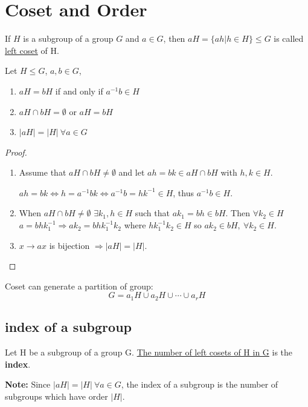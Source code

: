 \documentclass[11pt]{elegantbook}
\begin{document}
\section{Coset and Order}
\begin{definition}
If $H$ is a subgroup of a group $G$ and $a\in G$, then $aH=\{ah|h\in H\}\leq G$ is called \underline{left coset} of H.
\end{definition}
\begin{theorem}
Let $H\leq G$, $a,b\in G$,
\begin{enumerate}
    \item $aH=bH$ if and only if $a^{-1}b\in H$
    \item $aH\cap bH=\emptyset$ or $aH=bH$
    \item $|aH|=|H|\ \forall a\in G$
\end{enumerate}
\end{theorem}
\begin{proof}
    \quad

    \begin{enumerate}
        \item Assume that $aH\cap bH\neq \emptyset$ and let $ah=bk\in aH\cap bH$ with $h,k\in H$.

        $ah=bk\Leftrightarrow h=a^{-1}bk \Leftrightarrow a^{-1}b=hk^{-1}\in H$, thus $a^{-1}b\in H$.
        \item When $aH\cap bH\neq \emptyset$ $\exists k_1,h\in H$ such that $ak_1=bh\in bH$. Then $\forall k_2\in H$ $a=bhk_1^{-1} \Rightarrow ak_2=bhk_1^{-1}k_2$ where $hk_1^{-1}k_2\in H$ so $ak_2\in bH,\ \forall k_2\in H$.
        \item $x \rightarrow ax$ is bijection $\Rightarrow |aH|=|H|$.
    \end{enumerate}
\end{proof}

\begin{claim}
Coset can generate a partition of group:
$$G=a_1H\cup a_2H\cup \cdots \cup a_rH$$
\end{claim}

\subsection{index of a subgroup}
\begin{definition}
    Let H be a subgroup of a group G. \underline{The number of left cosets of H in G} is the \textbf{index}.
\end{definition}
\textbf{Note:} Since $|aH|=|H|\ \forall a\in G$, the index of a subgroup is the number of subgroups which have order $|H|$.
\end{document}
